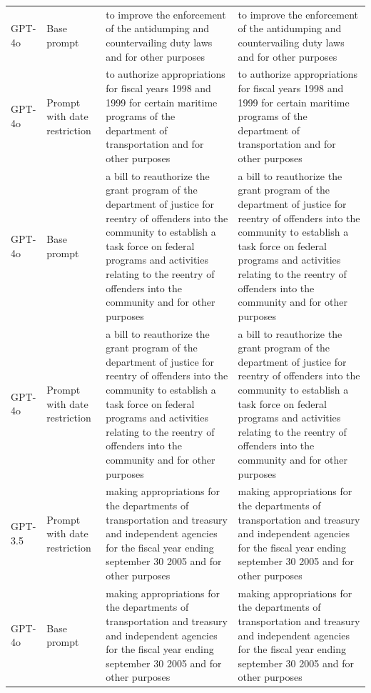 \begin{longtable}{>{\raggedright\arraybackslash}p{1.4cm}>{\raggedright\arraybackslash}p{1.4cm}>{\raggedright\arraybackslash}p{5.5cm}>{\raggedright\arraybackslash}p{5.5cm}}
GPT-4o & Base prompt & to improve the enforcement of the antidumping and countervailing duty laws and for other purposes & to improve the enforcement of the antidumping and countervailing duty laws and for other purposes\\
GPT-4o & Prompt with date restriction & to authorize appropriations for fiscal years 1998 and 1999 for certain maritime programs of the department of transportation and for other purposes & to authorize appropriations for fiscal years 1998 and 1999 for certain maritime programs of the department of transportation and for other purposes\\
GPT-4o & Base prompt & a bill to reauthorize the grant program of the department of justice for reentry of offenders into the community to establish a task force on federal programs and activities relating to the reentry of offenders into the community and for other purposes & a bill to reauthorize the grant program of the department of justice for reentry of offenders into the community to establish a task force on federal programs and activities relating to the reentry of offenders into the community and for other purposes\\
GPT-4o & Prompt with date restriction & a bill to reauthorize the grant program of the department of justice for reentry of offenders into the community to establish a task force on federal programs and activities relating to the reentry of offenders into the community and for other purposes & a bill to reauthorize the grant program of the department of justice for reentry of offenders into the community to establish a task force on federal programs and activities relating to the reentry of offenders into the community and for other purposes\\
GPT-3.5 & Prompt with date restriction & making appropriations for the departments of transportation and treasury and independent agencies for the fiscal year ending september 30 2005 and for other purposes & making appropriations for the departments of transportation and treasury and independent agencies for the fiscal year ending september 30 2005 and for other purposes\\
GPT-4o & Base prompt & making appropriations for the departments of transportation and treasury and independent agencies for the fiscal year ending september 30 2005 and for other purposes & making appropriations for the departments of transportation and treasury and independent agencies for the fiscal year ending september 30 2005 and for other purposes\\

\end{longtable}
